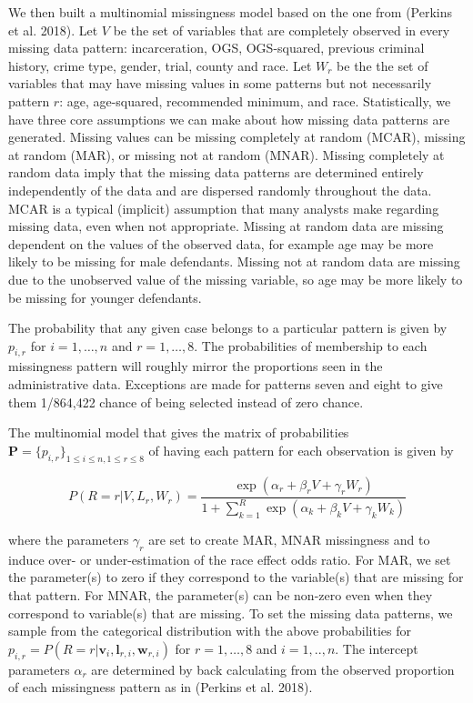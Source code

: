 \documentclass[
  letterpaper,
  DIV=11,
  numbers=noendperiod]{scrartcl}
\begin{document}
We then built a multinomial missingness model based on the one from
(Perkins et al. 2018). Let \(V\) be the set of variables that are
completely observed in every missing data pattern: incarceration, OGS,
OGS-squared, previous criminal history, crime type, gender, trial,
county and race. Let \(W_r\) be the the set of variables that may have
missing values in some patterns but not necessarily pattern \(r\): age,
age-squared, recommended minimum, and race. Statistically, we have three
core assumptions we can make about how missing data patterns are
generated. Missing values can be missing completely at random (MCAR),
missing at random (MAR), or missing not at random (MNAR). Missing
completely at random data imply that the missing data patterns are
determined entirely independently of the data and are dispersed randomly
throughout the data. MCAR is a typical (implicit) assumption that many
analysts make regarding missing data, even when not appropriate. Missing
at random data are missing dependent on the values of the observed data,
for example age may be more likely to be missing for male defendants.
Missing not at random data are missing due to the unobserved value of
the missing variable, so age may be more likely to be missing for
younger defendants.

The probability that any given case belongs to a particular pattern is
given by \(p_{i,r}\) for \(i = 1,…,n\) and \(r = 1,…,8\). The
probabilities of membership to each missingness pattern will roughly
mirror the proportions seen in the administrative data. Exceptions are
made for patterns seven and eight to give them 1/864,422 chance of being
selected instead of zero chance.

The multinomial model that gives the matrix of probabilities
\(\mathbf{P} = \{p_{i,r}\}_{1 \leq i \leq n, 1 \leq r \leq 8}\) of
having each pattern for each observation is given by

\[
P(R = r | V, L_r, W_r) = \frac{\exp(\alpha_r + \beta_r V + \gamma_r W_r)}{1 + \sum_{k = 1}^R\exp(\alpha_k + \beta_k V + \gamma_k W_k)}
\]

where the parameters \(\gamma_r\) are set to create MAR, MNAR
missingness and to induce over- or under-estimation of the race effect
odds ratio. For MAR, we set the parameter(s) to zero if they correspond
to the variable(s) that are missing for that pattern. For MNAR, the
parameter(s) can be non-zero even when they correspond to variable(s)
that are missing. To set the missing data patterns, we sample from the
categorical distribution with the above probabilities for
\(p_{i,r} = P(R = r | \mathbf{v}_i, \mathbf{l}_{r,i}, \mathbf{w}_{r,i})\)
for \(r = 1,…, 8\) and \(i = 1,.., n\). The intercept parameters
\(\alpha_r\) are determined by back calculating from the observed
proportion of each missingness pattern as in (Perkins et al. 2018).
\end{document}
